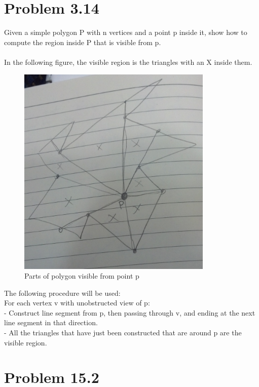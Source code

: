\documentclass[11pt,psfig]{article}
\begin{document}
\newpage

\section*{Problem 3.14}

Given a simple polygon P with n vertices and a point p inside it, show
how to compute the region inside P that is visible from p.\\
\\
In the following figure, the visible region is the triangles with an X inside them. \\
\begin{figure}[H]
\centering
\includegraphics[height=4in]{visible_regions.jpg}
\caption{Parts of polygon visible from point p}
\end{figure}

The following procedure will be used:\\
For each vertex v with unobstructed view of p:\\
- Construct line segment from p, then passing through v, and ending at the next line segment in that direction. \\
- All the triangles that have just been constructed that are around p are the visible region. 

\newpage

\section*{Problem 15.2}
\end{document}
